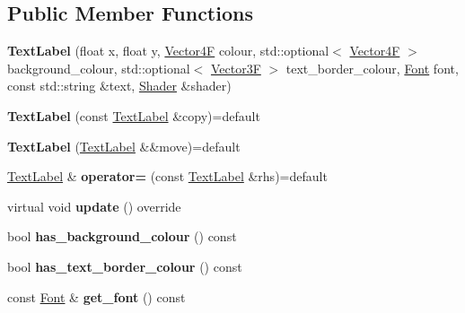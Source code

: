 \subsection*{Public Member Functions}
\begin{DoxyCompactItemize}
\item 
\mbox{\label{class_text_label_a8736731b5c5f1a8cffa984cfc332a859}} 
{\bfseries Text\+Label} (float x, float y, \mbox{\hyperlink{class_vector4}{Vector4F}} colour, std\+::optional$<$ \mbox{\hyperlink{class_vector4}{Vector4F}} $>$ background\+\_\+colour, std\+::optional$<$ \mbox{\hyperlink{class_vector3}{Vector3F}} $>$ text\+\_\+border\+\_\+colour, \mbox{\hyperlink{class_font}{Font}} font, const std\+::string \&text, \mbox{\hyperlink{class_shader}{Shader}} \&shader)
\item 
\mbox{\label{class_text_label_ae2d0c39b245449882cc66519acf6c6aa}} 
{\bfseries Text\+Label} (const \mbox{\hyperlink{class_text_label}{Text\+Label}} \&copy)=default
\item 
\mbox{\label{class_text_label_a27045baf12d91734102eca29411c71b5}} 
{\bfseries Text\+Label} (\mbox{\hyperlink{class_text_label}{Text\+Label}} \&\&move)=default
\item 
\mbox{\label{class_text_label_ad8cfeadea1dd3d1a869f5b8ef1e9eb70}} 
\mbox{\hyperlink{class_text_label}{Text\+Label}} \& {\bfseries operator=} (const \mbox{\hyperlink{class_text_label}{Text\+Label}} \&rhs)=default
\item 
\mbox{\label{class_text_label_a350a9edc23e4d2a53374fddc5ddc61cc}} 
virtual void {\bfseries update} () override
\item 
\mbox{\label{class_text_label_a551d9e453aed5769c47bf815f3954b87}} 
bool {\bfseries has\+\_\+background\+\_\+colour} () const
\item 
\mbox{\label{class_text_label_a3ebd1440ba16deddd630f59e32def63e}} 
bool {\bfseries has\+\_\+text\+\_\+border\+\_\+colour} () const
\item 
\mbox{\label{class_text_label_a9cf910ea092dd7b72c53a028e9ae3998}} 
const \mbox{\hyperlink{class_font}{Font}} \& {\bfseries get\+\_\+font} () const

\end{DoxyCompactItemize}
